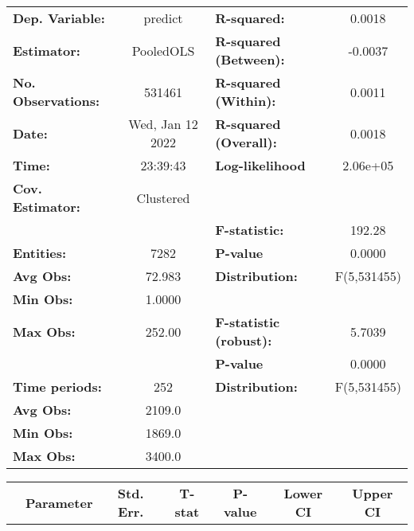 \begin{center}
\begin{tabular}{lclc}
\toprule
\textbf{Dep. Variable:}    &      predict       & \textbf{  R-squared:         }   &      0.0018      \\
\textbf{Estimator:}        &     PooledOLS      & \textbf{  R-squared (Between):}  &     -0.0037      \\
\textbf{No. Observations:} &       531461       & \textbf{  R-squared (Within):}   &      0.0011      \\
\textbf{Date:}             &  Wed, Jan 12 2022  & \textbf{  R-squared (Overall):}  &      0.0018      \\
\textbf{Time:}             &      23:39:43      & \textbf{  Log-likelihood     }   &     2.06e+05     \\
\textbf{Cov. Estimator:}   &     Clustered      & \textbf{                     }   &                  \\
\textbf{}                  &                    & \textbf{  F-statistic:       }   &      192.28      \\
\textbf{Entities:}         &        7282        & \textbf{  P-value            }   &      0.0000      \\
\textbf{Avg Obs:}          &       72.983       & \textbf{  Distribution:      }   &   F(5,531455)    \\
\textbf{Min Obs:}          &       1.0000       & \textbf{                     }   &                  \\
\textbf{Max Obs:}          &       252.00       & \textbf{  F-statistic (robust):} &      5.7039      \\
\textbf{}                  &                    & \textbf{  P-value            }   &      0.0000      \\
\textbf{Time periods:}     &        252         & \textbf{  Distribution:      }   &   F(5,531455)    \\
\textbf{Avg Obs:}          &       2109.0       & \textbf{                     }   &                  \\
\textbf{Min Obs:}          &       1869.0       & \textbf{                     }   &                  \\
\textbf{Max Obs:}          &       3400.0       & \textbf{                     }   &                  \\
\bottomrule
\end{tabular}
\begin{tabular}{lcccccc}
                & \textbf{Parameter} & \textbf{Std. Err.} & \textbf{T-stat} & \textbf{P-value} & \textbf{Lower CI} & \textbf{Upper CI}  \\

\end{tabular}
\end{center}
